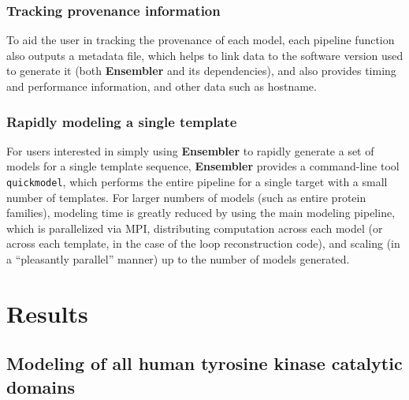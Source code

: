 \documentclass[aps,pre,twocolumn,nofootinbib,superscriptaddress,linenumbers]{revtex4-1}
\begin{document}
\subsubsection*{Tracking provenance information}

To aid the user in tracking the provenance of each model, each pipeline function also outputs a metadata file, which helps to link data to the software version used to generate it (both {\bf Ensembler} and its dependencies), and also provides timing and performance information, and other data such as hostname.

\subsubsection*{Rapidly modeling a single template}

For users interested in simply using {\bf Ensembler} to rapidly generate a set of models for a single template sequence, {\bf Ensembler} provides a command-line tool {\tt quickmodel}, which performs the entire pipeline for a single target with a small number of templates.
For larger numbers of models (such as entire protein families), modeling time is greatly reduced by using the main modeling pipeline, which is parallelized via MPI, distributing computation across each model (or across each template, in the case of the loop reconstruction code), and scaling (in a ``pleasantly parallel'' manner) up to the number of models generated.


\label{section:design}

\section{Results}
\label{section:results}

\subsection*{Modeling of all human tyrosine kinase catalytic domains}
\end{document}
